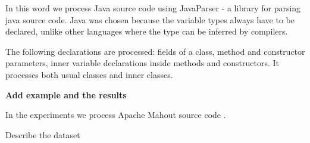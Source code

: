In this word we process Java source code using JavaParser \cite{javaparser} - 
a library for parsing java source code. Java was chosen because the variable 
types always have to be declared, unlike other languages where the type 
can be inferred by compilers. 

The following declarations are processed: fields of a class, method and 
constructor parameters, inner variable declarations inside 
methods and constructors. It processes both usual classes and inner classes. 

\textbf{Add example and the results}


In the experiments we process Apache Mahout source code \cite{mahout}. 

Describe the dataset
